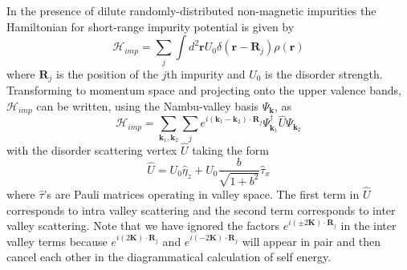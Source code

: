 In the presence of dilute randomly-distributed non-magnetic impurities
the Hamiltonian for short-range impurity potential is given by
\begin{equation}
\mathcal{H}_{imp}=\sum_{j}\int d^{2}\mathbf{r}U_{0}\delta(\mathbf{r}-\mathbf{R}_{j})\rho(\mathbf{r})\label{eq: impurity_H_real}
\end{equation}
where $\mathbf{R}_{j}$ is the position of the $j$th impurity and
$U_{0}$ is the disorder strength.
Transforming to momentum space
and projecting onto the upper valence bands, $\mathcal{H}_{imp}$
can be written, using the Nambu-valley basis $\Psi_{\mathbf{k}}$,
as
\begin{equation}
\mathcal{H}_{imp}=\sum_{\mathbf{k}_{1},\mathbf{k}_{2}}\sum_{j}e^{i(\mathbf{k}_{1}-\mathbf{k}_{2})\cdot\mathbf{R}_{j}}\Psi_{\mathbf{k}_{1}}^{\dagger}\hat{U}\Psi_{\mathbf{k}_{2}}\label{eq: impurity_H_momentum}
\end{equation}
with the disorder scattering vertex $\hat{U}$ taking the form
\begin{equation}
\hat{U}=U_{0}\hat{\eta}_{z}+U_{0}\frac{b}{\sqrt{1+b^{2}}}\hat{\tau}_{x}\label{eq: disorder_scattering_vertex}
\end{equation}
where $\hat{\tau}$'s are Pauli matrices operating in valley space.
The first term in $\hat{U}$ corresponds to intra valley scattering
and the second term corresponds to inter valley scattering.
Note that we have ignored the factors $e^{i(\pm2\mathbf{K})\cdot\mathbf{R}_{j}}$
in the inter valley terms because $e^{i(2\mathbf{K})\cdot\mathbf{R}_{j}}$
and $e^{i(-2\mathbf{K})\cdot\mathbf{R}_{j}}$ will appear in pair
and then cancel each other in the diagrammatical calculation of self
energy.

